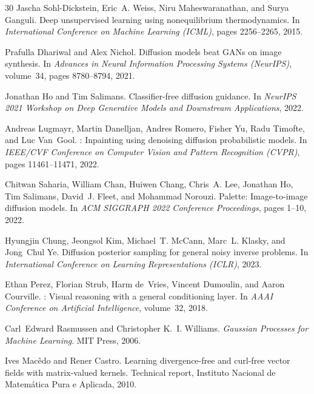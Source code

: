 \documentclass{article}
\begin{document}
\begin{thebibliography}{30}
Jascha Sohl-Dickstein, Eric~A. Weiss, Niru Maheswaranathan, and Surya Ganguli.
\newblock Deep unsupervised learning using nonequilibrium thermodynamics.
\newblock In \emph{International Conference on Machine Learning (ICML)}, pages 2256--2265, 2015.

Prafulla Dhariwal and Alex Nichol.
\newblock Diffusion models beat {GAN}s on image synthesis.
\newblock In \emph{Advances in Neural Information Processing Systems (NeurIPS)}, volume~34, pages 8780--8794, 2021.

Jonathan Ho and Tim Salimans.
\newblock Classifier-free diffusion guidance.
\newblock In \emph{NeurIPS 2021 Workshop on Deep Generative Models and Downstream Applications}, 2022.

Andreas Lugmayr, Martin Danelljan, Andres Romero, Fisher Yu, Radu Timofte, and Luc Van~Gool.
: Inpainting using denoising diffusion probabilistic models.
\newblock In \emph{IEEE/CVF Conference on Computer Vision and Pattern Recognition (CVPR)}, pages 11461--11471, 2022.

Chitwan Saharia, William Chan, Huiwen Chang, Chris~A. Lee, Jonathan Ho, Tim Salimans, David~J. Fleet, and Mohammad Norouzi.
\newblock Palette: Image-to-image diffusion models.
\newblock In \emph{ACM SIGGRAPH 2022 Conference Proceedings}, pages 1--10, 2022.

Hyungjin Chung, Jeongsol Kim, Michael~T. McCann, Marc~L. Klasky, and Jong~Chul Ye.
\newblock Diffusion posterior sampling for general noisy inverse problems.
\newblock In \emph{International Conference on Learning Representations (ICLR)}, 2023.

Ethan Perez, Florian Strub, Harm de~Vries, Vincent Dumoulin, and Aaron Courville.
: Visual reasoning with a general conditioning layer.
\newblock In \emph{AAAI Conference on Artificial Intelligence}, volume~32, 2018.

Carl~Edward Rasmussen and Christopher K.~I. Williams.
\newblock \emph{Gaussian Processes for Machine Learning}.
\newblock MIT Press, 2006.

Ives Mac\^{e}do and Rener Castro.
\newblock Learning divergence-free and curl-free vector fields with matrix-valued kernels.
\newblock Technical report, Instituto Nacional de Matem\'{a}tica Pura e Aplicada, 2010.


\end{thebibliography}
\end{document}
